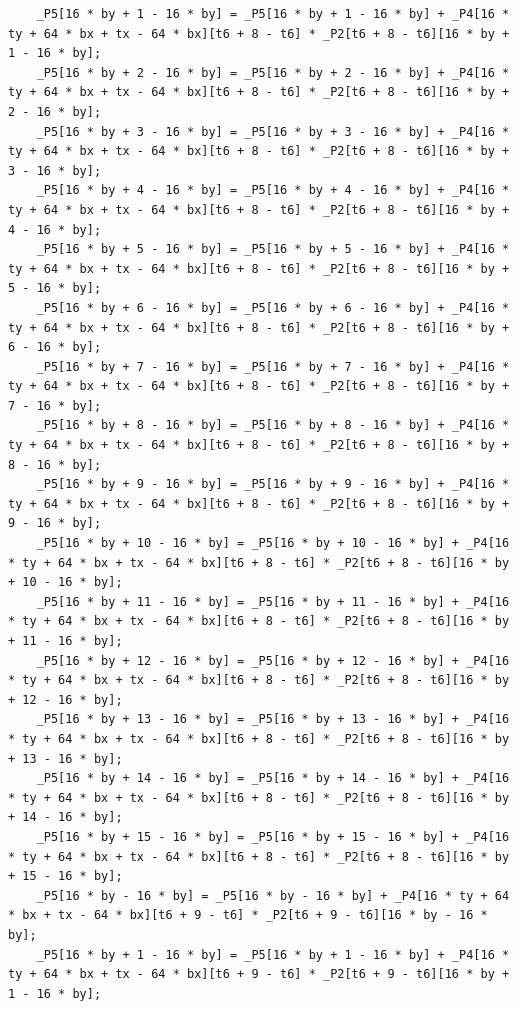 \documentclass[msthesis,justified,copyright,final,numbers,sort&compress,
gsmodern,amstex,natbib]{uothesis}
\begin{document}
\begin{lstlisting}
    _P5[16 * by + 1 - 16 * by] = _P5[16 * by + 1 - 16 * by] + _P4[16 * ty + 64 * bx + tx - 64 * bx][t6 + 8 - t6] * _P2[t6 + 8 - t6][16 * by + 1 - 16 * by];
    _P5[16 * by + 2 - 16 * by] = _P5[16 * by + 2 - 16 * by] + _P4[16 * ty + 64 * bx + tx - 64 * bx][t6 + 8 - t6] * _P2[t6 + 8 - t6][16 * by + 2 - 16 * by];
    _P5[16 * by + 3 - 16 * by] = _P5[16 * by + 3 - 16 * by] + _P4[16 * ty + 64 * bx + tx - 64 * bx][t6 + 8 - t6] * _P2[t6 + 8 - t6][16 * by + 3 - 16 * by];
    _P5[16 * by + 4 - 16 * by] = _P5[16 * by + 4 - 16 * by] + _P4[16 * ty + 64 * bx + tx - 64 * bx][t6 + 8 - t6] * _P2[t6 + 8 - t6][16 * by + 4 - 16 * by];
    _P5[16 * by + 5 - 16 * by] = _P5[16 * by + 5 - 16 * by] + _P4[16 * ty + 64 * bx + tx - 64 * bx][t6 + 8 - t6] * _P2[t6 + 8 - t6][16 * by + 5 - 16 * by];
    _P5[16 * by + 6 - 16 * by] = _P5[16 * by + 6 - 16 * by] + _P4[16 * ty + 64 * bx + tx - 64 * bx][t6 + 8 - t6] * _P2[t6 + 8 - t6][16 * by + 6 - 16 * by];
    _P5[16 * by + 7 - 16 * by] = _P5[16 * by + 7 - 16 * by] + _P4[16 * ty + 64 * bx + tx - 64 * bx][t6 + 8 - t6] * _P2[t6 + 8 - t6][16 * by + 7 - 16 * by];
    _P5[16 * by + 8 - 16 * by] = _P5[16 * by + 8 - 16 * by] + _P4[16 * ty + 64 * bx + tx - 64 * bx][t6 + 8 - t6] * _P2[t6 + 8 - t6][16 * by + 8 - 16 * by];
    _P5[16 * by + 9 - 16 * by] = _P5[16 * by + 9 - 16 * by] + _P4[16 * ty + 64 * bx + tx - 64 * bx][t6 + 8 - t6] * _P2[t6 + 8 - t6][16 * by + 9 - 16 * by];
    _P5[16 * by + 10 - 16 * by] = _P5[16 * by + 10 - 16 * by] + _P4[16 * ty + 64 * bx + tx - 64 * bx][t6 + 8 - t6] * _P2[t6 + 8 - t6][16 * by + 10 - 16 * by];
    _P5[16 * by + 11 - 16 * by] = _P5[16 * by + 11 - 16 * by] + _P4[16 * ty + 64 * bx + tx - 64 * bx][t6 + 8 - t6] * _P2[t6 + 8 - t6][16 * by + 11 - 16 * by];
    _P5[16 * by + 12 - 16 * by] = _P5[16 * by + 12 - 16 * by] + _P4[16 * ty + 64 * bx + tx - 64 * bx][t6 + 8 - t6] * _P2[t6 + 8 - t6][16 * by + 12 - 16 * by];
    _P5[16 * by + 13 - 16 * by] = _P5[16 * by + 13 - 16 * by] + _P4[16 * ty + 64 * bx + tx - 64 * bx][t6 + 8 - t6] * _P2[t6 + 8 - t6][16 * by + 13 - 16 * by];
    _P5[16 * by + 14 - 16 * by] = _P5[16 * by + 14 - 16 * by] + _P4[16 * ty + 64 * bx + tx - 64 * bx][t6 + 8 - t6] * _P2[t6 + 8 - t6][16 * by + 14 - 16 * by];
    _P5[16 * by + 15 - 16 * by] = _P5[16 * by + 15 - 16 * by] + _P4[16 * ty + 64 * bx + tx - 64 * bx][t6 + 8 - t6] * _P2[t6 + 8 - t6][16 * by + 15 - 16 * by];
    _P5[16 * by - 16 * by] = _P5[16 * by - 16 * by] + _P4[16 * ty + 64 * bx + tx - 64 * bx][t6 + 9 - t6] * _P2[t6 + 9 - t6][16 * by - 16 * by];
    _P5[16 * by + 1 - 16 * by] = _P5[16 * by + 1 - 16 * by] + _P4[16 * ty + 64 * bx + tx - 64 * bx][t6 + 9 - t6] * _P2[t6 + 9 - t6][16 * by + 1 - 16 * by];

\end{lstlisting}
\end{document}
